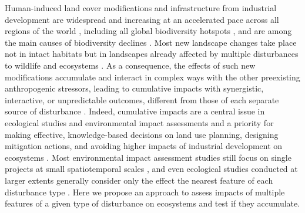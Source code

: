 \documentclass[titlepage]{article}
\begin{document}
Human-induced land cover modifications and infrastructure from industrial development are widespread and increasing at an accelerated pace across all regions of the world \citep{venter_sixteen_2016,ibisch_global_2016}, including all global biodiversity hotspots \citep{sloan_remaining_2014}, and are among the main causes of biodiversity declines \citep{benitez-lopez_impacts_2010,newbold_global_2015}. Most new landscape changes take place not in intact habitats but in landscapes already affected by multiple disturbances to wildlife and ecosystems \citep{barber_roads_2014}. As a consequence, the effects of such new modifications accumulate and interact in complex ways with the other preexisting anthropogenic stressors, leading to cumulative impacts \citep[Box 1; ][]{gillingham_integration_2016} with synergistic, interactive, or unpredictable outcomes, different from those of each separate source of disturbance \citep{naugle_unifying_2011}. 
Indeed, cumulative impacts are a central issue in ecological studies and environmental impact assessments and a priority for making effective, knowledge-based decisions on land use planning, designing mitigation actions, and avoiding higher impacts of industrial development on ecosystems \citep{gillingham_integration_2016, laurance_roads_2017}. Most environmental impact assessment studies still focus on single projects at small spatiotemporal scales \citep{johnson_regulating_2011}, and even ecological studies conducted at larger extents generally consider only the effect the nearest feature of each disturbance type \citep[e.g.][]{torres_assessing_2016}. Here we propose an approach to assess impacts of multiple features of a given type of disturbance on ecosystems and test if  they accumulate. 

\end{document}
